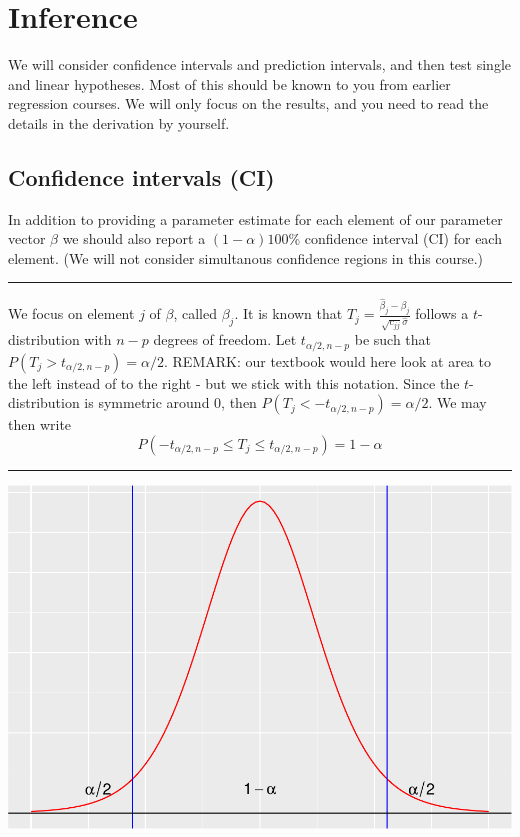 \documentclass[
]{article}
\begin{document}
\hypertarget{inference}{%
\section{Inference}\label{inference}}

We will consider confidence intervals and prediction intervals, and then
test single and linear hypotheses. Most of this should be known to you
from earlier regression courses. We will only focus on the results, and
you need to read the details in the derivation by yourself.

\hypertarget{confidence-intervals-ci}{%
\subsection{Confidence intervals (CI)}\label{confidence-intervals-ci}}

In addition to providing a parameter estimate for each element of our
parameter vector \(\beta\) we should also report a \((1-\alpha)100\)\%
confidence interval (CI) for each element. (We will not consider
simultanous confidence regions in this course.)

\begin{center}\rule{0.5\linewidth}{0.5pt}\end{center}

We focus on element \(j\) of \(\beta\), called \(\beta_j\). It is known
that \(T_j =\frac{\hat{\beta}_j-\beta_j}{\sqrt{c_{jj}}\hat{\sigma}}\)
follows a \(t\)-distribution with \(n-p\) degrees of freedom. Let
\(t_{\alpha/2,n-p}\) be such that \(P(T_j>t_{\alpha/2,n-p})=\alpha/2\).
REMARK: our textbook would here look at area to the left instead of to
the right - but we stick with this notation. Since the
\(t\)-distribution is symmetric around 0, then
\(P(T_j< -t_{\alpha/2,n-p})=\alpha/2\). We may then write
\[ P(-t_{\alpha/2,n-p}\le T_j \le t_{\alpha/2,n-p})=1-\alpha\]

\begin{center}\rule{0.5\linewidth}{0.5pt}\end{center}

\includegraphics{2MLR_files/figure-latex/unnamed-chunk-37-1.pdf}
\end{document}
